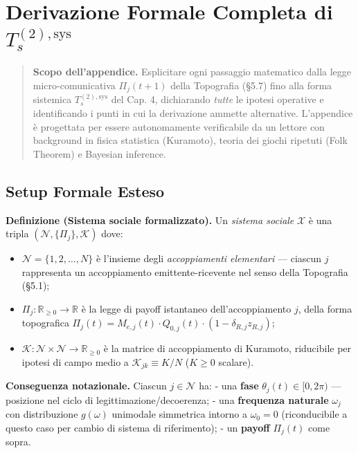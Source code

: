 \chapter{\texorpdfstring{Derivazione Formale Completa di
\(T_s^{(2),\text{sys}}\)}{Derivazione Formale Completa di T\_s\^{}\{(2),\textbackslash text\{sys\}\}}}\label{derivazione-formale-completa-di-t_s2textsys}

\begin{quote}
\textbf{Scopo dell'appendice.} Esplicitare ogni passaggio matematico
dalla legge micro-comunicativa \(\Pi_j(t+1)\) della Topografia (\S{}5.7)
fino alla forma sistemica \(T_s^{(2),\text{sys}}\) del Cap. 4,
dichiarando \emph{tutte} le ipotesi operative e identificando i punti in
cui la derivazione ammette alternative. L'appendice è progettata per
essere autonomamente verificabile da un lettore con background in fisica
statistica (Kuramoto), teoria dei giochi ripetuti (Folk Theorem) e
Bayesian inference.
\end{quote}



\section{Setup Formale Esteso}\label{setup-formale-esteso}

\Hypoth{} \textbf{Definizione (Sistema sociale formalizzato).} Un
\emph{sistema sociale} \(\mathcal{X}\) è una tripla
\((\mathcal{N}, \{\Pi_j\}, \mathcal{K})\) dove:

\begin{itemize}
\tightlist
\item
  \(\mathcal{N} = \{1, 2, \ldots, N\}\) è l'insieme degli
  \emph{accoppiamenti elementari} --- ciascun \(j\) rappresenta un
  accoppiamento emittente-ricevente nel senso della Topografia (\S{}5.1);
\item
  \(\Pi_j : \mathbb{R}_{\geq 0} \to \mathbb{R}\) è la legge di payoff
  istantaneo dell'accoppiamento \(j\), della forma topografica
  \(\Pi_j(t) = M_{e,j}(t) \cdot Q_{0,j}(t) \cdot (1 - \delta_{R,j} z_{R,j})\);
\item
  \(\mathcal{K} : \mathcal{N} \times \mathcal{N} \to \mathbb{R}_{\geq 0}\)
  è la matrice di accoppiamento di Kuramoto, riducibile per ipotesi di
  campo medio a \(\mathcal{K}_{jk} \equiv K/N\) (\(K \geq 0\) scalare).
\end{itemize}

\Proved{} \textbf{Conseguenza notazionale.} Ciascun
\(j \in \mathcal{N}\) ha: - una \textbf{fase}
\(\theta_j(t) \in [0, 2\pi)\) --- posizione nel ciclo di
legittimazione/decoerenza; - una \textbf{frequenza naturale}
\(\omega_j\) con distribuzione \(g(\omega)\) unimodale simmetrica
intorno a \(\omega_0 = 0\) (riconducibile a questo caso per cambio di
sistema di riferimento); - un \textbf{payoff} \(\Pi_j(t)\) come sopra.



